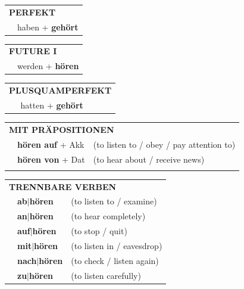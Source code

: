 \documentclass[10pt,a4paper]{revtex4-2}
\begin{document}
\begin{verbbox-acc}
    \vspace{10pt}

 \begin{tabular}{rl}
     \multicolumn{2}{l}{\textbf{PERFEKT}}\\
    &haben + \textbf{gehört}\\
  \end{tabular}
\hfill
   \begin{tabular}{rl}
   
    \multicolumn{2}{l}{\textbf{FUTURE I} }\\
    &werden + \textbf{hören}\\
 
  \end{tabular}
\hfill
   \begin{tabular}{rl}
      \multicolumn{2}{l}{\textbf{PLUSQUAMPERFEKT}}\\
    &hatten + \textbf{gehört}\\
  \end{tabular}
  

  \vspace{10pt}

   \begin{tabular}{lll}
      \multicolumn{3}{l}{\textbf{MIT PRÄPOSITIONEN}}\\
& \textbf{hören auf} + Akk & (to listen to / obey / pay attention to)\\
& \textbf{hören von} + Dat & (to hear about / receive news)\\
\vspace{30pt}
  \end{tabular}
  \hfill
   \begin{tabular}{lll}
      \multicolumn{3}{l}{\textbf{TRENNBARE VERBEN}}\\
 & \textbf{ab$|$hören} & (to listen to / examine)\\
 & \textbf{an$|$hören} & (to hear completely)\\
 & \textbf{auf$|$hören} & (to stop / quit)\\
  & \textbf{mit$|$hören} & (to listen in / eavesdrop)\\
  & \textbf{nach$|$hören} & (to check / listen again)\\
   & \textbf{zu$|$hören} & (to listen carefully)\\
  \end{tabular}

  \vspace{-5pt}

\end{verbbox-acc}
\end{document}
